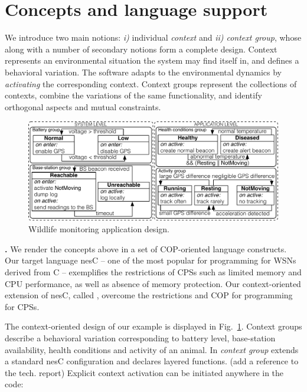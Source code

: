 \section{Concepts and language support}

We introduce two main notions: \emph{i)} individual \emph{context} and \emph{ii)
context group}, whose along with a number of secondary notions form a complete
design. Context represents an environmental situation the system may find itself
in, and defines a behavioral variation. The software adapts to the environmental
dynamics by \emph{activating} the corresponding context. Context groups
represent the collections of contexts, combine the variations of the same
functionality, and identify orthogonal aspects and mutual constraints.

\begin{figure}
\begin{center}
\includegraphics[scale=.45]{imgs/wildlifetracking}
\vspace{-1mm}
\caption{Wildlife monitoring application design.}
  \label{fig:design}
\vspace{-9mm}
\end{center}
\end{figure}

{\bf \conesc.} We render the concepts above in a set of COP-oriented language
constructs. Our target language nesC -- one of the most popular for programming
for WSNs derived from C -- exemplifies the restrictions of CPSs such as limited
memory and CPU performance, as well as absence of memory protection. Our
context-oriented extension of nesC, called \conesc, overcome the restrictions
and COP for programming for CPSs.

The context-oriented design of our example is displayed in
Fig.~\ref{fig:design}. Context groups describe a behavioral variation
corresponding to battery level, base-station availability, health conditions and
activity of an animal. In \conesc \emph{context group} extends a standard nesC
configuration and declares layered functions. (add a reference to the tech.
report) Explicit context activation can be initiated anywhere in the code:

